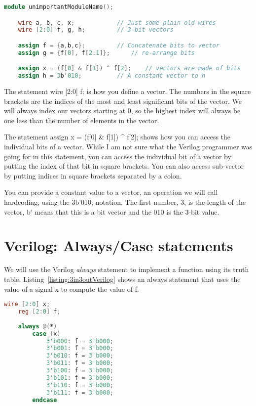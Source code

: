 \begin{lstlisting}[language=Verilog,
 caption={Verilog code which illustrates vector manipulations and declarations.},
 label={listing:vectorManipulation},
 frame=single]
module unimportantModuleName();

    wire a, b, c, x;			// Just some plain old wires
    wire [2:0] f, g, h;			// 3-bit vectors

    assign f = {a,b,c};			// Concatenate bits to vector
    assign g = {f[0], f[2:1]};		// re-arrange bits

    assign x = (f[0] & f[1]) ^ f[2];	// vectors are made of bits
    assign h = 3b'010;			// A constant vector to h
\end{lstlisting}

The statement wire {[}2:0{]} f; is how you define a vector. The numbers
in the square brackets are the indices of the most and least significant
bits of the vector. We will always index our vectors starting at 0, so
the highest index will always be one less than the number of elements in
the vector.

The statement assign x = (f{[}0{]} \& f{[}1{]}) \^{} f{[}2{]}; shows how
you can access the individual bits of a vector. While I am not sure what
the Verilog programmer was going for in this statement, you can access
the individual bit of a vector by putting the index of that bit in
square brackets. You can also access sub-vector by putting indices in
square brackets separated by a colon.

You can provide a constant value to a vector, an operation we will call
hardcoding, using the 3b'010; notation. The first number, 3, is the
length of the vector, b' means that this is a bit vector and the 010 is
the 3-bit value.

\section{Verilog: Always/Case statements}

We will use the Verilog \emph{always} statement to implement a function
using its truth table. Listing~\ref{listing:3in3outVerilog} shows an always statement that uses the
value of a signal x to compute the value of f.

\begin{lstlisting}[language=Verilog,
 caption={A 3-input, 3-output function realized with an always statement.},
 label={listing:3in3outVerilog},
 frame=single]
    wire [2:0] x;
    reg [2:0] f;
    
    always @(*)
        case (x)
            3'b000: f = 3'b000;
            3'b001: f = 3'b000;
            3'b010: f = 3'b000;
            3'b011: f = 3'b000;
            3'b100: f = 3'b000;
            3'b101: f = 3'b000;
            3'b110: f = 3'b000;
            3'b111: f = 3'b000;
        endcase
\end{lstlisting}

